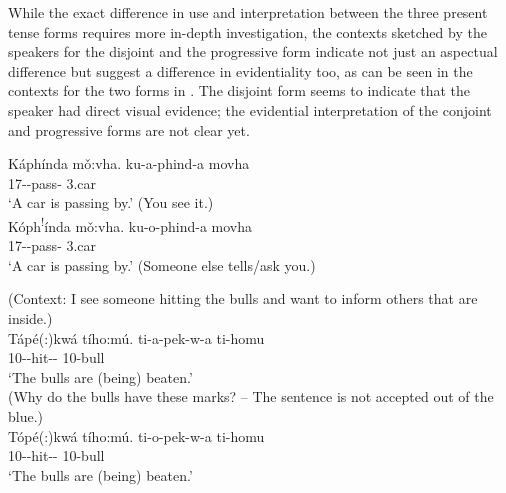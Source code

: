 \documentclass[output=paper]{langscibook}
\begin{document}
\z

While the exact difference in use and interpretation between the three present tense forms requires more in-depth investigation, the contexts sketched by the speakers for the disjoint and the progressive form indicate not just an aspectual difference but suggest a difference in evidentiality  too, as can be seen in the contexts for the two forms in . The disjoint form seems to indicate that the speaker had direct visual evidence; the evidential interpretation of the conjoint and progressive forms are not clear yet.\largerpage[2.25]

\ea
\label{bkm:Ref127267131}
\ea
Káphínda mǒ:vha. \jambox*{[disjoint]}
\gll
ku-a-phind-a  movha\\
17\SM{}-\DJ{}-pass-\FV{}   3.car\\
\glt
‘A car is passing by.’ (You see it.)\\



\ex
Kóph\textsuperscript{!}índa mǒ:vha. \jambox*{[progressive]}
\gll
ku-o-phind-a  movha\\
17\SM{}-\PROG{}-pass-\FV{}  3.car\\
\glt
‘A car is passing by.’ (Someone else tells/ask you.)\\

\z
\z

\ea
\ea
(Context: I see someone hitting the bulls and want to inform others that are inside.)\\
{Tápé(:)kwá tího:mú.}\jambox*{[disjoint]}
\gll
ti-a-pek-w-a  ti-homu\\
10\SM{}-\DJ{}-hit-\PASS{}-\FV{}  10-bull\\
\glt
‘The bulls are (being) beaten.’\\


\ex
(Why do the bulls have these marks? -- The sentence is not accepted out of the blue.)\\
{Tópé(:)kwá tího:mú.}\jambox*{[progressive]}
\gll
ti-o-pek-w-a  ti-homu\\
10\SM{}-\PROG{}-hit-\PASS{}-\FV{}  10-bull\\
\glt
‘The bulls are (being) beaten.’\\
\end{document}
